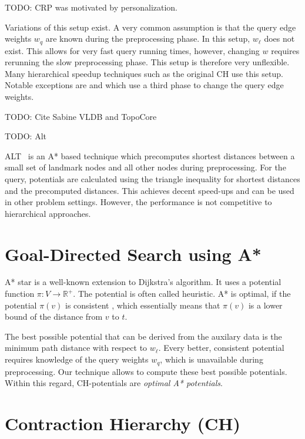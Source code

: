 \documentclass[a4paper,UKenglish,cleveref, autoref]{lipics-v2019}
\begin{document}
TODO: CRP was motivated by personalization.

Variations of this setup exist.
A very common assumption is that the query edge weights $w_q$ are known during the preprocessing phase.
In this setup, $w_\ell$ does not exist.
This allows for very fast query running times, however, changing $w$ requires rerunning the slow preprocessing phase.
This setup is therefore very unflexible.
Many hierarchical speedup techniques such as the original CH \cite{CH} use this setup.
Notable exceptions are \cite{MLD,CRP} and \cite{CCH} which use a third phase to change the query edge weights.


TODO: Cite Sabine VLDB and TopoCore

TODO: Alt

ALT~\cite{gh-cspas-05} is an A* based technique which precomputes shortest distances between a small set of landmark nodes and all other nodes during preprocessing.
For the query, potentials are calculated using the triangle inequality for shortest distances and the precomputed distances.
This achieves decent speed-ups and can be used in other problem settings.
However, the performance is not competitive to hierarchical approaches.

\section{Goal-Directed Search using A*}

A* star is a well-known extension to Dijkstra's algorithm.
It uses a potential function $\pi:V\rightarrow \mathbb{R}^+$.
The potential is often called heuristic.
A* is optimal, if the potential $\pi(v)$ is consistent \cite{Pearl, Judea (1984). Heuristics: Intelligent Search Strategies for Computer Problem Solving. Addison-Wesley. ISBN 0-201-05594-5.}, which essentially means that $\pi(v)$ is a lower bound of the distance from $v$ to $t$.

The best possible potential that can be derived from the auxilary data is the minimum path distance with respect to $w_\ell$.
Every better, consistent potential requires knowledge of the query weights $w_q$, which is unavailable during preprocessing.
Our technique allows to compute these best possible potentials.
Within this regard, CH-potentials are \emph{optimal A* potentials}.

\section{Contraction Hierarchy (CH)}
\end{document}

